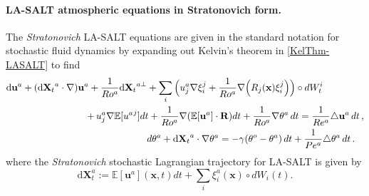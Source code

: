\documentclass[11pt, oneside]{article}   	%
\numberwithin{equation}{section}
\theoremstyle{plain}
\theoremstyle{definition}
\theoremstyle{remark}
\newcommand{\<}{\langle}
\renewcommand{\>}{\rangle}
\def\rmd{{\mathrm{d}}}
\newcommand{\bs}[1]{\boldsymbol{#1}}
\begin{document}
\paragraph{LA-SALT atmospheric equations in Stratonovich form.}

The \emph{Stratonovich} LA-SALT equations are given 
in the standard notation for stochastic fluid dynamics by expanding out Kelvin's theorem in \eqref{KelThm-LASALT} to find
%
\begin{align}
{\rmd}\mathbf{u}^{a}+({\rmd\mathbf{X}_{t}}^{a}\cdot \nabla )\mathbf{u}%
^{a}+\frac{1}{Ro^{a}}{\rmd\mathbf{X}_{t}}^{a\bot }& 
+{ \sum_{i}\Big(u_{j}^{a}\nabla \xi _{i}^{j}+\frac{1}{Ro^{a}}\nabla \Big(R_{j}%
\mathbf{(x})\xi _{i}^{j}\Big)\Big)\circ dW_{t}^{i}} 
 \notag\\
& \hspace{-22mm}{+\,u_{j}^{a}\nabla \mathbb{E}[{u^{a}}^{j}]dt+%
\frac{1}{Ro^{a}}\nabla (\mathbb{E}[{\mathbf{u}}^{a}]\cdot \mathbf{R})dt}+%
\frac{1}{Ro^{a}}\nabla \theta ^{a}\,dt=\frac{1}{Re^{a}}\triangle \mathbf{u}^{a}\,dt\,,
 \notag\\
& d\theta ^{a}+{\rmd\mathbf{X}_{t}}^{a}\cdot \nabla \theta
^{a}=-\gamma (\theta ^{o}-\theta ^{a})\,dt + \frac{1}{Pe^{a}}\triangle \theta ^{a}\,dt\,.
\label{COUPLED_SWE_T_A_STOCH_LA-Strat-Intro}
\end{align}
where the \emph{Stratonovich} stochastic Lagrangian trajectory for LA-SALT is given by
% 
\begin{equation}
{{\rmd}\mathbf{X}_{t}^{a}} 
:= {\mathbb{E}[\mathbf{u}^{a}]}(\bs{x},t)dt + \sum_{i}\xi _{i}^{a}(\bs{x})\circ dW_{i}(t).
\label{Lag-path-Strat}
\end{equation}
%
\end{document}
